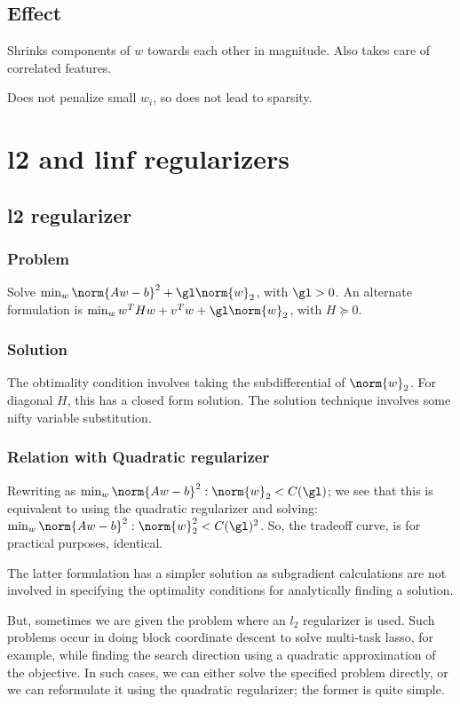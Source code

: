 \documentclass[oneside, article]{memoir}
\begin{document}
\subsection{Effect}
Shrinks components of $w$ towards each other in magnitude. Also takes care of correlated features.

Does not penalize small $w_i$, so does not lead to sparsity.

\section{l2 and linf regularizers}
\subsection{l2 regularizer}
\subsubsection{Problem}
Solve $\min_w \norm{Aw - b}^{2} + \gl \norm{w}_2$, with $\gl > 0$. An alternate formulation is $\min_w w^{T}Hw + v^{T}w + \gl \norm{w}_2$, with $H \succeq 0$.

\subsubsection{Solution}
The obtimality condition involves taking the subdifferential of $\norm{w}_2$. For diagonal $H$, this has a closed form solution. The solution technique involves some nifty variable substitution.

\subsubsection{Relation with Quadratic regularizer}
Rewriting as $\min_w \norm{Aw - b}^{2} : \norm{w}_2 < C(\gl)$; we see that this is equivalent to using the quadratic regularizer and solving: $\min_w \norm{Aw - b}^{2} : \norm{w}_2^{2} < C(\gl)^{2}$. So, the tradeoff curve, is for practical purposes, identical.

The latter formulation has a simpler solution as subgradient calculations are not involved in specifying the optimality conditions for analytically finding a solution.

But, sometimes we are given the problem where an $l_2$ regularizer is used. Such problems occur in doing block coordinate descent to solve multi-task lasso, for example, while finding the search direction using a quadratic approximation of the objective. In such cases, we can either solve the specified problem directly, or we can reformulate it using the quadratic regularizer; the former is quite simple.
\end{document}

